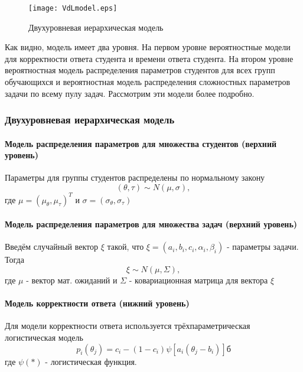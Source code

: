 \begin{figure}[ht!]
\centering \texttt{[image: VdLmodel.eps]}
\caption{Двухуровневая иерархическая модель}
\end{figure}

Как видно, модель имеет два уровня. На первом уровне вероятностные модели для корректности ответа студента и времени ответа студента. На втором уровне вероятностная модель распределения параметров студентов для всех групп обучающихся и вероятностная модель распределения слож\-ностных параметров задачи по всему пулу задач. Рассмотрим эти модели более подробно.

\subsubsection{Двухуровневая иерархическая модель}

\paragraph {Модель распределения параметров для множества студентов (верхний уровень)}

Параметры для группы студентов распределены по нормальному закону
\begin{equation}
(\theta,\tau) \sim N(\mu,\sigma),
\end{equation}
где $\mu = (\mu_\theta, \mu_\tau)^T$ и $\sigma=(\sigma_\theta,\sigma_\tau)$

\paragraph {Модель распределения параметров для множества задач (верхний уровень)}

Введём случайный вектор $\xi$ такой, что $\xi = (a_i,b_i,c_i,\alpha_i, \beta_i)$ - параметры задачи. Тогда
\begin{equation}
\xi \sim N(\mu,\Sigma),
\end{equation}
где $\mu$ - вектор мат. ожиданий и $\Sigma$ - ковариационная матрица для вектора  $\xi$

\paragraph {Модель корректности ответа (нижний уровень)}

Для модели кор\-ректности ответа используется трёхпараметрическая логистическая модель
\begin{equation}
p_i(\theta_j) = c_i - (1-c_i)\psi[a_i(\theta_j - b_i)]б
\end{equation}
где $\psi( * )$ - логистическая функция.

